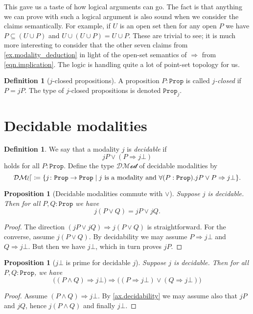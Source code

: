 \documentclass[11pt, oneside, article]{memoir}
\theoremstyle{plain}
\newtheorem{proposition}[theorem]{Proposition}
\theoremstyle{definition}
\newtheorem{definition}[theorem]{Definition}
\theoremstyle{remark}
\renewcommand{\ss}{\subseteq}
\newcommand{\const}[1]{\mathtt{#1}}
\newcommand{\tn}[1]{\textnormal{#1}}
\newcommand{\prop}{\const{Prop}}
\newcommand{\decmod}{\mathcal{DMod}}
\newcommand{\imp}{\Rightarrow}
\newcommand{\false}{\bot}
\begin{document}
This gave us a taste of how logical arguments can go. The fact is that anything we can prove with such a logical argument is also sound when we consider the claims semantically. For example, if $U$ is an open set then for any open $P$ we have $P\ss (U\cup P)$ and $U\cup(U\cup P)=U\cup P$. These are trivial to see; it is much more interesting to consider that the other seven claims from \cref{ex.modality_deduction} in light of the open-set semantics of $\imp$ from \eqref{eqn.implication}. The logic is handling quite a lot of point-set topology for us.



\begin{definition}[$j$-closed propositions]\label{def.j_closed_props}
A proposition $P:\prop$ is called \emph{$j$-closed} if $P=jP$. The type of $j$-closed propositions is denoted $\prop_j$.
\end{definition}

\section{Decidable modalities}

\begin{definition}\label{def.decidable_modality}
We say that a modality $j$ is \emph{decidable} if 
\[jP\vee (P\imp j\false)\]
holds for all $P:\prop$. Define the type $\decmod$ of decidable modalities by
\[
\decmod\coloneqq\{j\colon\prop\to\prop\mid j\tn{ is a modality and } \forall(P:\prop).jP\vee P\imp j\bot\}.
\]
\end{definition}

\begin{proposition}[Decidable modalities commute with $\vee$]\label{prop.dec_mod_or}
Suppose $j$ is decidable. Then for all $P,Q:\prop$ we have
\[j (P \lor Q) = j P \lor j Q.\]
\end{proposition}
\begin{proof}
The direction $(j P \lor j Q)\imp j (P \lor Q)$ is straightforward. For the converse, assume $j (P \lor Q)$. By decidability we may assume $P\imp j \bot$ and $Q\imp j \bot$. But then we have $j \bot$, which in turn proves $j P$.
\end{proof}

\begin{proposition}[$j \bot$ is prime for decidable $j$]
Suppose $j$ is decidable. Then for all $P,Q:\prop$, we have
\[\big((P\wedge Q)\imp j \false\big)\imp\big((P\imp j \false)\vee(Q\imp j \false)\big)\]
\end{proposition}
\begin{proof}
Assume $(P\wedge Q)\imp j \false$. By \cref{ax.decidability} we may assume also that $j P$ and $j Q$, hence $j (P\wedge Q)$ and finally $j \bot$.
\end{proof}
\end{document}
